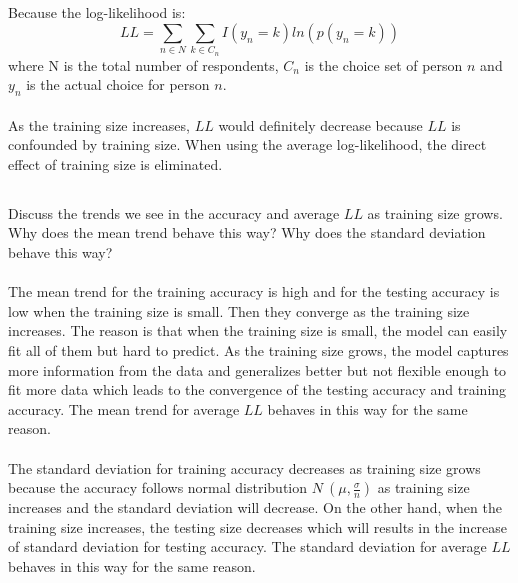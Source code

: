 \documentclass[11pt]{article}
\begin{document}
\subsection{}
Because the log-likelihood is:
\begin{equation}
LL=\sum_{n\in N}\sum_{k\in C_n}I(y_n=k)ln(p(y_n=k))
\end{equation}
where N is the total number of respondents, $C_n$ is the choice set of person $n$ and $y_n$ is the actual choice for person $n$.\\\\
As the training size increases, $LL$ would definitely decrease because $LL$ is confounded by training size. When using the average log-likelihood, the direct effect of training size is eliminated.
\newpage
\subsection{}
Discuss the trends we see in the accuracy and average $LL$ as training size grows. Why does the mean trend behave this way? Why does the standard deviation behave this way?\\\\
The mean trend for the training accuracy is high and for the testing accuracy is low when the training size is small. Then they converge as the training size increases. The reason is that when the training size is small, the model can easily fit all of them but hard to predict. As the training size grows, the model captures more information from the data and generalizes better but not flexible enough to fit more data which leads to the convergence of the testing accuracy and training accuracy. The mean trend for average $LL$ behaves in this way for the same reason.\\\\
The standard deviation for training accuracy decreases as training size grows because the accuracy follows normal distribution $N~(\mu,\frac{\sigma}{n})$ as training size increases and the standard deviation will decrease. On the other hand, when the training size increases, the testing size decreases which will results in the increase of standard deviation for testing accuracy. The standard deviation for average $LL$ behaves in this way for the same reason.
\newpage
\section{}
\end{document}

